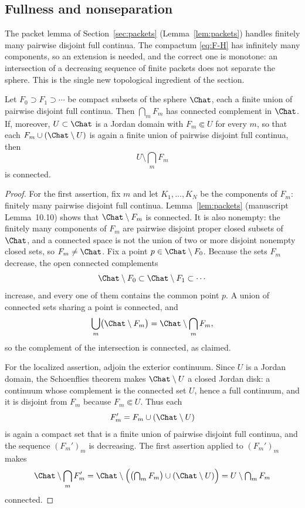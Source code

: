 \subsection{Fullness and nonseparation}\label{subsec:F-fullness}

The packet lemma of Section~\ref{sec:packets}
(Lemma~\ref{lem:packets}) handles finitely many pairwise disjoint full
continua.  The compactum \eqref{eq:F-H} has infinitely many components,
so an extension is needed, and the correct one is monotone: an
intersection of a decreasing sequence of finite packets does not
separate the sphere.  This is the single new topological ingredient of
the section.

\begin{lemma}\label{lem:nested-packets}
Let $F_0\supset F_1\supset\cdots$ be compact subsets of the sphere
$\Chat$, each a finite union of pairwise disjoint full continua.  Then
$\bigcap_m F_m$ has connected complement in $\Chat$.  If, moreover,
$U\subset\Chat$ is a Jordan domain with $F_m\Subset U$ for every $m$, so
that each $F_m\cup(\Chat\setminus U)$ is again a finite union of pairwise
disjoint full continua, then
\[
U\setminus\bigcap_m F_m
\]
is connected.
\end{lemma}

\begin{proof}
For the first assertion, fix $m$ and let $K_1,\dots,K_N$ be the
components of $F_m$: finitely many pairwise disjoint full continua.
Lemma~\ref{lem:packets} (manuscript Lemma~10.10) shows that
$\Chat\setminus F_m$ is connected.  It is also nonempty: the finitely
many components of $F_m$ are pairwise disjoint proper closed subsets of
$\Chat$, and a connected space is not the union of two or more disjoint
nonempty closed sets, so $F_m\neq\Chat$.  Fix a point
$p\in\Chat\setminus F_0$.  Because the sets $F_m$ decrease, the open
connected complements
\[
\Chat\setminus F_0\subset\Chat\setminus F_1\subset\cdots
\]
increase, and every one of them contains the common point $p$.  A union
of connected sets sharing a point is connected, and
\[
\bigcup_m\bigl(\Chat\setminus F_m\bigr)
=\Chat\setminus\bigcap_m F_m ,
\]
so the complement of the intersection is connected, as claimed.

For the localized assertion, adjoin the exterior continuum.  Since $U$ is
a Jordan domain, the Schoenflies theorem \cite{New51} makes
$\Chat\setminus U$ a closed Jordan disk: a continuum whose complement is
the connected set $U$, hence a full continuum, and it is disjoint from
$F_m$ because $F_m\Subset U$.  Thus each
\[
F_m'=F_m\cup(\Chat\setminus U)
\]
is again a compact set that is a finite union of pairwise disjoint full
continua, and the sequence $(F_m')_m$ is decreasing.  The first assertion
applied to $(F_m')_m$ makes
\[
\Chat\setminus\bigcap_m F_m'
=\Chat\setminus\Bigl(\bigl(\textstyle\bigcap_m F_m\bigr)
\cup(\Chat\setminus U)\Bigr)
=U\setminus\bigcap_m F_m
\]
connected.
\end{proof}

